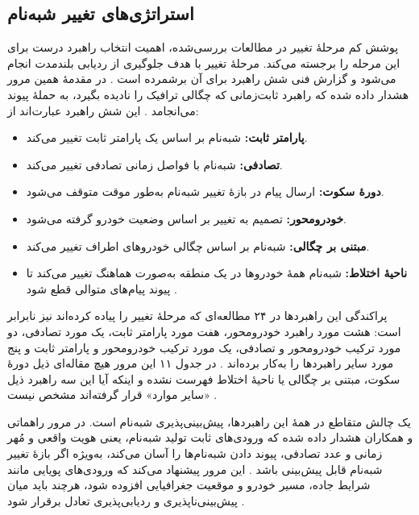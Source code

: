 \documentclass[12pt,a4paper]{article}
\begin{document}
\subsection{استراتژی‌های تغییر شبه‌نام }

پوشش کم مرحلهٔ تغییر در مطالعات بررسی‌شده، اهمیت انتخاب راهبرد درست برای این مرحله را برجسته می‌کند. مرحلهٔ تغییر با هدف جلوگیری از ردیابی بلندمدت انجام می‌شود و گزارش فنی  شش راهبرد برای آن برشمرده است \cite{rahmawatiagustinaSystematicLiteratureReview2025}. در مقدمهٔ همین مرور هشدار داده شده که راهبرد ثابت‌زمانی که چگالی ترافیک را نادیده بگیرد، به حملهٔ پیوند می‌انجامد \cite{rahmawatiagustinaSystematicLiteratureReview2025}. این شش راهبرد عبارت‌اند از:

\begin{itemize}
  \item \textbf{پارامتر ثابت:} شبه‌نام بر اساس یک پارامتر ثابت تغییر می‌کند.
  \item \textbf{تصادفی:} شبه‌نام با فواصل زمانی تصادفی تغییر می‌کند.
  \item \textbf{دورهٔ سکوت:} ارسال پیام در بازهٔ تغییر شبه‌نام به‌طور موقت متوقف می‌شود.
  \item \textbf{خودرومحور:} تصمیم به تغییر بر اساس وضعیت خودرو گرفته می‌شود.
  \item \textbf{مبتنی بر چگالی:} شبه‌نام بر اساس چگالی خودرو‌های اطراف تغییر می‌کند.
  \item \textbf{ناحیهٔ اختلاط:} شبه‌نام همهٔ خودرو‌ها در یک منطقه به‌صورت هماهنگ تغییر می‌کند تا پیوند پیام‌های متوالی قطع شود \cite{VanetSecurityPrivacy}.
\end{itemize}

پراکندگی این راهبرد‌ها در ۲۴ مطالعه‌ای که مرحلهٔ تغییر را پیاده کرده‌اند نیز نابرابر است: هشت مورد راهبرد خودرومحور، هفت مورد پارامتر ثابت، یک مورد تصادفی، دو مورد ترکیب خودرومحور و تصادفی، یک مورد ترکیب خودرومحور و پارامتر ثابت و پنج مورد سایر راهبرد‌ها را به‌کار برده‌اند \cite{rahmawatiagustinaSystematicLiteratureReview2025}. در جدول ۱۱ این مرور هیچ مقاله‌ای ذیل دورهٔ سکوت، مبتنی بر چگالی یا ناحیهٔ اختلاط فهرست نشده و اینکه آیا این سه راهبرد ذیل «سایر موارد» قرار گرفته‌اند مشخص نیست \cite{rahmawatiagustinaSystematicLiteratureReview2025}.

یک چالش متقاطع در همهٔ این راهبردها، پیش‌بینی‌پذیری شبه‌نام است. در مرور راهماتی و همکاران هشدار داده شده که ورودی‌های ثابت تولید شبه‌نام، یعنی هویت واقعی و مُهر زمانی و عدد تصادفی، پیوند دادن شبه‌نام‌ها را آسان می‌کند، به‌ویژه اگر بازهٔ تغییر شبه‌نام قابل پیش‌بینی باشد \cite{rahmawatiagustinaSystematicLiteratureReview2025}. این مرور پیشنهاد می‌کند که ورودی‌های پویایی مانند شرایط جاده، مسیر خودرو و موقعیت جغرافیایی افزوده شود، هرچند باید میان پیش‌بینی‌ناپذیری و ردیابی‌پذیری تعادل برقرار شود \cite{rahmawatiagustinaSystematicLiteratureReview2025}.
\end{document}
